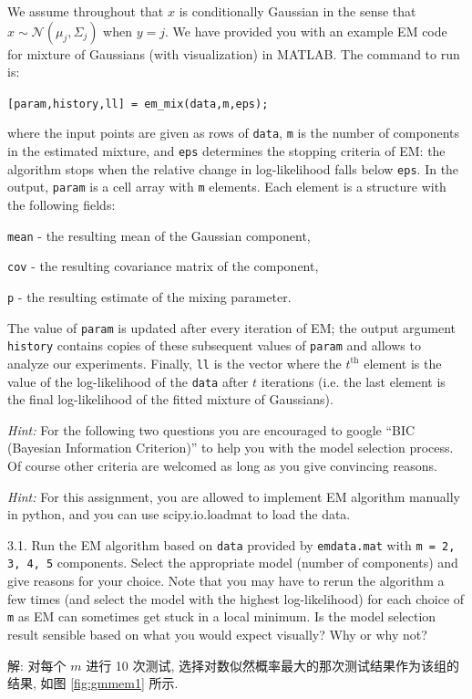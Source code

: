 \documentclass[openany]{ctexbook}
\theoremstyle{kaiti}
\theoremstyle{normal}
\begin{document}
We assume throughout that $x$ is conditionally Gaussian in the sense that $x \sim \mathcal{N}(\mu_j, \Sigma_j)$ when $y = j$. We have provided you with an example EM code for mixture of Gaussians (with visualization) in MATLAB. The command to run is: 

\verb|[param,history,ll] = em_mix(data,m,eps);| 

where the input points are given as rows of \verb|data|, \verb|m| is the number of components in the estimated mixture, and \verb|eps| determines the stopping criteria of EM: the algorithm stops when the relative change in log-likelihood falls below \verb|eps|. In the output, \verb|param| is a cell array with \verb|m| elements. Each element is a structure with the following fields:

\verb|mean| - the resulting mean of the Gaussian component,

\verb|cov| - the resulting covariance matrix of the component,

\verb|p| - the resulting estimate of the mixing parameter.

The value of \verb|param| is updated after every iteration of EM; the output argument \verb|history| contains copies of these subsequent values of \verb|param| and allows to analyze our experiments. Finally, \verb|ll| is the vector where the $t^{\mathrm{th}}$ element is the value of the log-likelihood of the \verb|data| after $t$ iterations (i.e. the last element is the final log-likelihood of the fitted mixture of Gaussians).

\emph{Hint:} For the following two questions you are encouraged to google ``BIC (Bayesian Information Criterion)'' to help you with the model selection process. Of course other criteria are welcomed as long as you give convincing reasons.

\emph{Hint:} For this assignment, you are allowed to implement EM algorithm manually in python, and you can use scipy.io.loadmat to load the data.

3.1. Run the EM algorithm based on \verb|data| provided by \verb|emdata.mat| with \verb|m = 2, 3, 4, 5| components. Select the appropriate model (number of components) and give reasons for your choice. Note that you may have to rerun the algorithm a few times (and select the model with the highest log-likelihood) for each choice of \verb|m| as EM can sometimes get stuck in a local minimum. Is the model selection result sensible based on what you would expect visually? Why or why not?

解: 对每个 $m$ 进行 10 次测试, 选择对数似然概率最大的那次测试结果作为该组的结果, 如图 \ref{fig:gmmem1} 所示. 
\end{document}
